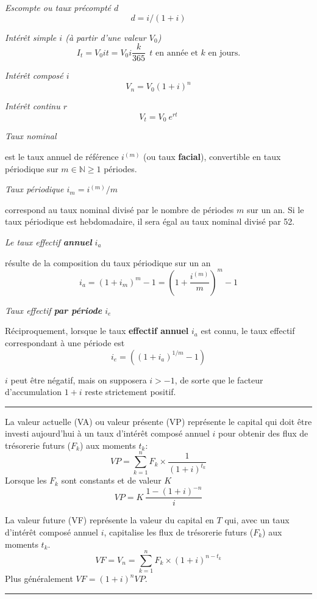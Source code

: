 \begin{f}

\emph{Escompte ou taux précompté \(d\)}
 \[
 d=i/(1+i)
 \]
 
\emph{Intérêt simple \(i\) (à partir d'une valeur \(V_0\))}
\[
I_t=V_0 i t=V_0 i \frac{k}{365}\ \ t \text{ en année et } k\text{ en jours.}
\]


\emph{Intérêt composé \(i\)}
\[
V_n=V_0(1+i)^n%
\]

\emph{Intérêt continu \(r\)}
\[
V_t=V_0\ e^{rt}
\]

\emph{Taux nominal}

est le taux annuel de référence \(i^{(m)}\) (ou taux \textbf{facial}), convertible en taux périodique sur \(m\in \mathbb{N} \geq 1\) périodes.
\smallskip

\emph{Taux périodique \(i_m=i^{(m)}/m\)}

correspond au taux nominal divisé par le nombre de périodes \(m\) sur un an.
Si le taux périodique est hebdomadaire, il sera égal au taux nominal divisé par 52.
\smallskip

\emph{Le taux effectif \textbf{annuel} \(i_a\)}

 résulte de la composition du taux périodique sur un an
\[
i_a=\left( 1+i_m\right)^{m}-1=\left( 1+\frac{i^{(m)}}{m}\right)^{m}-1
\]

\emph{Taux effectif \textbf{par période} \(i_e\)}

Réciproquement, lorsque le taux \textbf{effectif annuel} \(i_a\) est connu, le taux effectif correspondant à une période est 
\[
i_e=\left( (1+i_a)^{1 / m}-1\right) 
\]

\(i\) peut être négatif, mais on supposera \(i>-1\), de sorte que le facteur d'accumulation \(1+i\) reste strictement positif.
\end{f}
\hrule

\begin{f}

La valeur actuelle (VA)  ou valeur présente (VP)  représente le capital qui doit être investi aujourd'hui à un taux d'intérêt composé annuel \(i\) pour obtenir des flux de trésorerie futurs (\(F_k\)) aux moments \(t_k\):
\begin{equation}
	VP = \sum_{k=1}^{n} F_k \times \frac{1}{(1+i)^{t_k}}
\label{ValeurActuelle}
\end{equation}
Lorsque les \(F_k\) sont constants et de valeur \(K\)
\begin{equation}
	VP = K\   \frac{1 - (1+i)^{-n}} {i}
\label{ValeurActuelleFluxCt}
\end{equation}

La valeur future (VF) représente la valeur du capital en \(T\) qui, avec un taux d'intérêt composé annuel \(i\),  capitalise les flux de trésorerie futurs (\(F_k\)) aux moments \(t_k\).
\begin{equation}
	VF=V_n = \sum_{k=1}^{n} F_k \times (1+i)^{n-t_k}
\end{equation}
Plus généralement \(VF= (1+i)^{n}VP\).
\end{f}
\hrule

